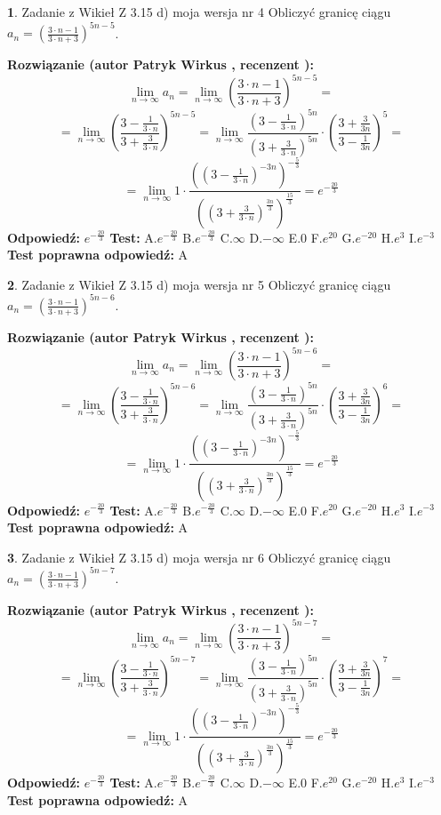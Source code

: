 \documentclass[12pt, a4paper]{article}
\theoremstyle{definition} %
\newtheorem{zad}{}
\newcommand{\zadStart}[1]{\begin{zad}#1\newline}
\newcommand{\zadStop}{\end{zad}}
\newcommand{\rozwStart}[2]{\noindent \textbf{Rozwiązanie (autor #1 , recenzent #2): }\newline}
\newcommand{\rozwStop}{\newline}
\newcommand{\odpStart}{\noindent \textbf{Odpowiedź:}\newline}
\newcommand{\odpStop}{\newline}
\newcommand{\testStart}{\noindent \textbf{Test:}\newline}
\newcommand{\testStop}{\newline}
\newcommand{\kluczStart}{\noindent \textbf{Test poprawna odpowiedź:}\newline}
\newcommand{\kluczStop}{\newline}
\begin{document}
\zadStart{Zadanie z Wikieł Z 3.15 d) moja wersja nr 4}
Obliczyć granicę ciągu $a_{n}=(\frac{3\cdot n - 1}{3 \cdot n + 3})^{5n-5}$.
\zadStop
\rozwStart{Patryk Wirkus}{}
$$\lim\limits_{n\to\infty} a_{n} = \lim\limits_{n\to\infty}(\frac{3\cdot n - 1}{3 \cdot n + 3})^{5n-5}=$$
$$=\lim\limits_{n\to\infty}(\frac{3 - \frac{1}{3\cdot n}}{3 + \frac{3}{3 \cdot n}})^{5n-5}=\lim\limits_{n\to\infty}\frac{(3 - \frac{1}{3\cdot n})^{5n}}{(3 + \frac{3}{3\cdot n})^{5n}} \cdot (\frac{3+\frac{3}{3n}}{3-\frac{1}{3n}})^{5}=$$
$$=\lim\limits_{n\to\infty} 1 \cdot \frac{((3-\frac{1}{3 \cdot n})^{-3n})^{-\frac{5}{3}}}{((3+\frac{3}{3 \cdot n})^{\frac{3n}{3}})^{\frac{15}{3}}} =e^{-\frac{20}{3}}$$
\rozwStop
\odpStart
$e^{-\frac{20}{3}}$
\odpStop
\testStart
A.$ e^{-\frac{20}{3}}$
B.$ e^{-\frac{20}{3}}$
C.$\infty$
D.$-\infty$
E.$0$
F.$e^{20}$
G.$e^{-20}$
H.$e^{3}$
I.$e^{-3}$
\testStop
\kluczStart
A
\kluczStop



\zadStart{Zadanie z Wikieł Z 3.15 d) moja wersja nr 5}
Obliczyć granicę ciągu $a_{n}=(\frac{3\cdot n - 1}{3 \cdot n + 3})^{5n-6}$.
\zadStop
\rozwStart{Patryk Wirkus}{}
$$\lim\limits_{n\to\infty} a_{n} = \lim\limits_{n\to\infty}(\frac{3\cdot n - 1}{3 \cdot n + 3})^{5n-6}=$$
$$=\lim\limits_{n\to\infty}(\frac{3 - \frac{1}{3\cdot n}}{3 + \frac{3}{3 \cdot n}})^{5n-6}=\lim\limits_{n\to\infty}\frac{(3 - \frac{1}{3\cdot n})^{5n}}{(3 + \frac{3}{3\cdot n})^{5n}} \cdot (\frac{3+\frac{3}{3n}}{3-\frac{1}{3n}})^{6}=$$
$$=\lim\limits_{n\to\infty} 1 \cdot \frac{((3-\frac{1}{3 \cdot n})^{-3n})^{-\frac{5}{3}}}{((3+\frac{3}{3 \cdot n})^{\frac{3n}{3}})^{\frac{15}{3}}} =e^{-\frac{20}{3}}$$
\rozwStop
\odpStart
$e^{-\frac{20}{3}}$
\odpStop
\testStart
A.$ e^{-\frac{20}{3}}$
B.$ e^{-\frac{20}{3}}$
C.$\infty$
D.$-\infty$
E.$0$
F.$e^{20}$
G.$e^{-20}$
H.$e^{3}$
I.$e^{-3}$
\testStop
\kluczStart
A
\kluczStop



\zadStart{Zadanie z Wikieł Z 3.15 d) moja wersja nr 6}
Obliczyć granicę ciągu $a_{n}=(\frac{3\cdot n - 1}{3 \cdot n + 3})^{5n-7}$.
\zadStop
\rozwStart{Patryk Wirkus}{}
$$\lim\limits_{n\to\infty} a_{n} = \lim\limits_{n\to\infty}(\frac{3\cdot n - 1}{3 \cdot n + 3})^{5n-7}=$$
$$=\lim\limits_{n\to\infty}(\frac{3 - \frac{1}{3\cdot n}}{3 + \frac{3}{3 \cdot n}})^{5n-7}=\lim\limits_{n\to\infty}\frac{(3 - \frac{1}{3\cdot n})^{5n}}{(3 + \frac{3}{3\cdot n})^{5n}} \cdot (\frac{3+\frac{3}{3n}}{3-\frac{1}{3n}})^{7}=$$
$$=\lim\limits_{n\to\infty} 1 \cdot \frac{((3-\frac{1}{3 \cdot n})^{-3n})^{-\frac{5}{3}}}{((3+\frac{3}{3 \cdot n})^{\frac{3n}{3}})^{\frac{15}{3}}} =e^{-\frac{20}{3}}$$
\rozwStop
\odpStart
$e^{-\frac{20}{3}}$
\odpStop
\testStart
A.$ e^{-\frac{20}{3}}$
B.$ e^{-\frac{20}{3}}$
C.$\infty$
D.$-\infty$
E.$0$
F.$e^{20}$
G.$e^{-20}$
H.$e^{3}$
I.$e^{-3}$
\testStop
\kluczStart
A
\kluczStop
\end{document}
